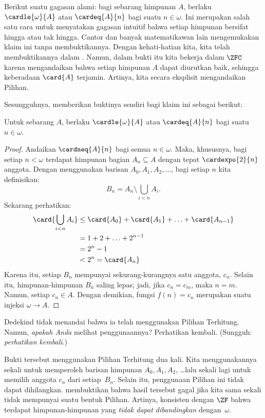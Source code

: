 \documentclass[../../../include/open-logic-section]{subfiles}
\begin{document}
\begin{ex}
Berikut suatu gagasan alami: bagi sebarang himpunan $A$, berlaku
$\cardle{\omega}{A}$ atau $\cardeq{A}{n}$ bagi suatu $n\in\omega$. Ini
merupakan salah satu cara untuk menyatakan gagasan intuitif bahwa setiap
himpunan bersifat hingga atau tak hingga. Cantor dan banyak matematikawan
lain mengemukakan klaim ini tanpa membuktikannya. Dengan kehati-hatian kita,
kita telah membuktikannya dalam
. Namun, dalam bukti itu
kita bekerja dalam $\ZFC$ karena mengandaikan bahwa setiap himpunan $A$
dapat diurutkan baik, sehingga keberadaan $\card{A}$ terjamin. Artinya, kita
secara eksplisit mengandaikan Pilihan.

Sesungguhnya, \citet{Dedekind1888} memberikan buktinya sendiri bagi klaim
ini sebagai berikut:

\begin{thm}
Untuk sebarang $A$, berlaku $\cardle{\omega}{A}$ atau $\cardeq{A}{n}$ bagi
suatu $n \in \omega$.
\end{thm}

\begin{proof}
Andaikan $\cardneq{A}{n}$ bagi semua $n\in\omega$. Maka, khususnya, bagi
setiap $n<\omega$ terdapat himpunan bagian $A_n\subseteq A$ dengan tepat
$\cardexpo{2}{n}$ anggota. Dengan menggunakan barisan
$A_0,A_1,A_2,\ldots$, bagi setiap $n$ kita definisikan:
\[
	B_n = A_n \setminus \bigcup_{i < n} A_i.
\]
Sekarang perhatikan:
\begin{align*}
	\card{\bigcup_{i < n}A_i}
	&\leq \card{A_0} + \card{A_1} + \ldots + \card{A_{n-1}}\\
	&=1 + 2 + \ldots + 2^{n-1}\\
	& = 2^n - 1\\
	& < 2^n = \card{A_n}
\end{align*}
Karena itu, setiap $B_n$ mempunyai sekurang-kurangnya satu anggota,
$c_n$. Selain itu, himpunan-himpunan $B_n$ saling lepas; jadi, jika
$c_n=c_m$, maka $n=m$. Namun, setiap $c_n\in A$. Dengan demikian, fungsi
$f(n)=c_n$ merupakan suatu injeksi $\omega\to A$.
\end{proof}
\noindent
Dedekind tidak menandai bahwa ia telah menggunakan Pilihan Terhitung. Namun,
\emph{apakah Anda} melihat penggunaannya? Perhatikan kembali.
(Sungguh: \emph{perhatikan kembali}.)

Bukti tersebut menggunakan Pilihan Terhitung dua kali. Kita menggunakannya
sekali untuk memperoleh barisan himpunan $A_0,A_1,A_2$, \dots\@ lalu sekali
lagi untuk memilih anggota $c_n$ dari setiap~$B_n$. Selain itu, penggunaan
Pilihan ini tidak dapat dihilangkan. \citet[hlm.~138]{Cohen1966}
membuktikan bahwa hasil tersebut gagal jika kita sama sekali tidak mempunyai
suatu bentuk Pilihan. Artinya, konsisten dengan $\ZF$ bahwa terdapat
himpunan-himpunan yang \emph{tidak dapat dibandingkan} dengan~$\omega$.
\end{ex}
\end{document}
